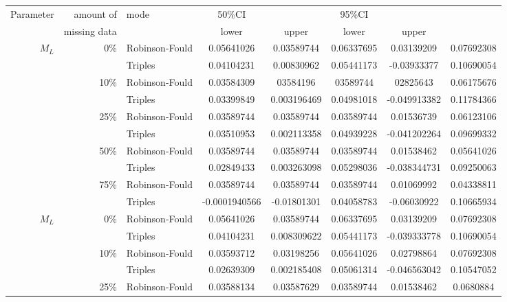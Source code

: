 \begin{tabular}{rrlccccc}
    \hline
    Parameter & amount of    & mode & 50\%CI &       & 95\%CI & \\
              & missing data &      & lower  & upper & lower  & upper \\
    \hline
    $M_L$     & 0\%          & Robinson-Fould & 0.05641026 & 0.03589744  & 0.06337695 & 0.03139209  & 0.07692308 \\ %
              &              & Triples        & 0.04104231 & 0.00830962  & 0.05441173 & -0.03933377  & 0.10690054 \\
              & 10\%         & Robinson-Fould & 0.03584309 & 03584196  & 03589744 & 02825643  & 0.06175676 \\
              &              & Triples        & 0.03399849 & 0.003196469  & 0.04981018 & -0.049913382  & 0.11784366 \\
              & 25\%         & Robinson-Fould & 0.03589744 & 0.03589744  & 0.03589744 & 0.01536739  & 0.06123106 \\
              &              & Triples        & 0.03510953 & 0.002113358  & 0.04939228 & -0.041202264  & 0.09699332 \\
              & 50\%         & Robinson-Fould & 0.03589744 & 0.03589744  & 0.03589744 & 0.01538462  & 0.05641026 \\
              &              & Triples        & 0.02849433 & 0.003263098  & 0.05298036 & -0.038344731  & 0.09250063 \\
              & 75\%         & Robinson-Fould & 0.03589744 & 0.03589744  & 0.03589744 & 0.01069992  & 0.04338811 \\
              &              & Triples        & -0.0001940566 & -0.01801301  & 0.04058783 & -0.06030922  & 0.10665934 \\
    $M_L$     & 0\%          & Robinson-Fould & 0.05641026 & 0.03589744  & 0.06337695 & 0.03139209  & 0.07692308 \\
              &              & Triples        & 0.04104231 & 0.008309622  & 0.05441173 & -0.039333778  & 0.10690054 \\
              & 10\%         & Robinson-Fould & 0.03593712 & 0.03198256  & 0.05641026 & 0.02798864  & 0.07692308 \\
              &              & Triples        & 0.02639309 & 0.002185408  & 0.05061314 & -0.046563042  & 0.10547052 \\
              & 25\%         & Robinson-Fould & 0.03588134 & 0.03587629  & 0.03589744 & 0.01538462  & 0.0680884 \\

\end{tabular}
